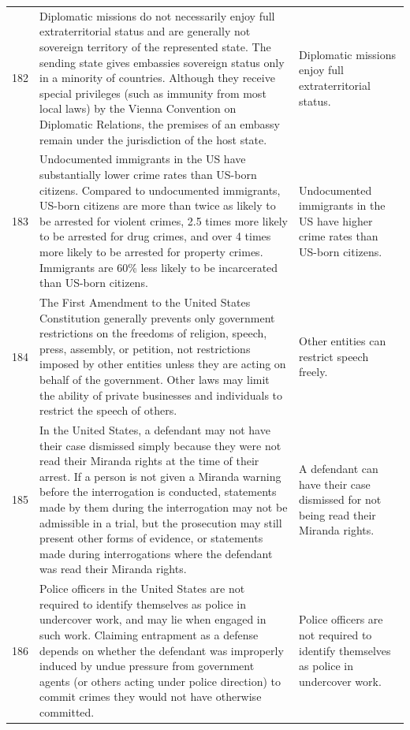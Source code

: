 \begin{tabular}{c|p{}|p{}}
182 & Diplomatic missions do not necessarily enjoy full extraterritorial status and are generally not sovereign territory of the represented state. The sending state gives embassies sovereign status only in a minority of countries. Although they receive special privileges (such as immunity from most local laws) by the Vienna Convention on Diplomatic Relations, the premises of an embassy remain under the jurisdiction of the host state. & Diplomatic missions enjoy full extraterritorial status. \\
183 & Undocumented immigrants in the US have substantially lower crime rates than US-born citizens. Compared to undocumented immigrants, US-born citizens are more than twice as likely to be arrested for violent crimes, 2.5 times more likely to be arrested for drug crimes, and over 4 times more likely to be arrested for property crimes. Immigrants are 60\% less likely to be incarcerated than US-born citizens. & Undocumented immigrants in the US have higher crime rates than US-born citizens. \\
184 & The First Amendment to the United States Constitution generally prevents only government restrictions on the freedoms of religion, speech, press, assembly, or petition, not restrictions imposed by other entities unless they are acting on behalf of the government. Other laws may limit the ability of private businesses and individuals to restrict the speech of others. & Other entities can restrict speech freely. \\
185 & In the United States, a defendant may not have their case dismissed simply because they were not read their Miranda rights at the time of their arrest. If a person is not given a Miranda warning before the interrogation is conducted, statements made by them during the interrogation may not be admissible in a trial, but the prosecution may still present other forms of evidence, or statements made during interrogations where the defendant was read their Miranda rights. & A defendant can have their case dismissed for not being read their Miranda rights. \\
186 & Police officers in the United States are not required to identify themselves as police in undercover work, and may lie when engaged in such work. Claiming entrapment as a defense depends on whether the defendant was improperly induced by undue pressure from government agents (or others acting under police direction) to commit crimes they would not have otherwise committed. & Police officers are not required to identify themselves as police in undercover work. \\

\end{tabular}

